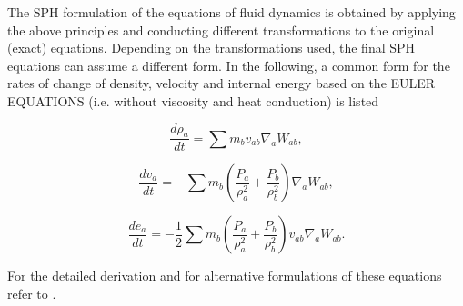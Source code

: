 \documentclass{report}
\begin{document}
The SPH formulation of the equations of fluid
dynamics is obtained by applying the above principles and conducting different
transformations to the original (exact) equations. Depending on the
transformations used, the final SPH equations can assume a different form. In
the following, a common form for the rates of change of density, velocity and
internal energy based on the EULER EQUATIONS (i.e. without viscosity and heat conduction)
is listed\cite{Monaghan2005,Liu2003} 

\begin{equation}
\label{eq:DCR_Euler}
\frac{d\rho _a}{\mathit{dt}}=\sum{m_{b}v_{\mathit{ab}}\nabla _{a}W_{\mathit{ab}}},
\end{equation}

\begin{equation}
\label{eq:VCR_Euler}
\frac{dv_{a}}{\mathit{dt}}=-\sum {m_{b}\left(\frac{P_{a}}{\rho_{a}^{2}}+\frac{P_{b}}{\rho _{b}^{2}}\right)\nabla_{a}W_{ab}},
\end{equation}


\begin{equation}
\label{eq:ECR_Euler}
\frac{de_{a}}{\mathit{dt}}=-\mathit{}\frac{1}{2}\sum{m_{b}\left(\frac{P_{a}}{\rho _{a}^{2}}+\frac{P_{b}}{\rho _{b}^{2}}\right)v_{\mathit{ab}}\nabla _{a}W_{\mathit{ab}}}.
\end{equation}

For the detailed derivation and for alternative formulations of
these equations refer to \cite{Monaghan2005, Liu2003}.



\end{document}
